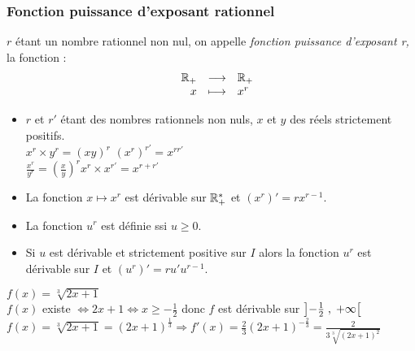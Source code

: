 \subsubsection*{Fonction puissance d'exposant rationnel}
\begin{definition}
$ r $ étant un nombre rationnel non nul, on appelle \emph{fonction puissance d'exposant r,} la fonction : 
\renewcommand{\arraystretch}{1}
\[\begin{array}{lrcl}
    &  \mathbb{R}_+  & \longrightarrow & \mathbb{R}_+ \\ 
  &  x & \longmapsto & x^{r}
   \end{array}\]
\end{definition}
\begin{property}
\begin{itemize}
\item $ r$ et $r' $ étant des nombres rationnels non nuls, $x $ et $ y$ des réels strictement positifs.\\ 

\hspace{2cm} \colorbox{green!20!} {$ x^{r}\times y^{r}= (xy)^{r} $ \qquad \qquad  $ (x^{r})^{r'}=x^{rr'} $} \\

\hspace{2cm}  \colorbox{green!20!}{$ \frac{x^{r}}{y^{r}}=(\frac{x}{y})^{r} $\qquad \qquad  $ x^{r}\times x^{r'}=x^{r+r'} $}\\

\item La fonction $x  \longmapsto x^{r}  $ est dérivable sur $ \mathbb{R}_+^* $ et $( x^{r})'=rx^{r-1}$.
\item La fonction $ u^{r} $ est définie ssi $ u\geq 0. $
  \item   Si $ u $ est dérivable et strictement positive sur $ I $ alors la fonction  $ u^{r} $ est dérivable sur $ I $ et $ (u^{r})'=ru'u^{r-1} $.
 \end{itemize}
 \end{property}
 \begin{example}
 $ f(x)= \sqrt[3]{2x+1} $\\
 $ f(x) $  existe $ \Leftrightarrow 2x+1 \Leftrightarrow x \geq -\frac{1}{2} $ donc $ f $ est dérivable sur $ \left]-\frac{1}{2} \;,\; +\infty\right[ $\\
  $ f(x)= \sqrt[3]{2x+1}=(2x+1)^{\frac{1}{3}}\Longrightarrow f'(x)=\frac{2}{3}(2x+1)^{-\frac{2}{3}}=\frac{2}{3\sqrt[3]{(2x+1)^2}} $
 \end{example}


